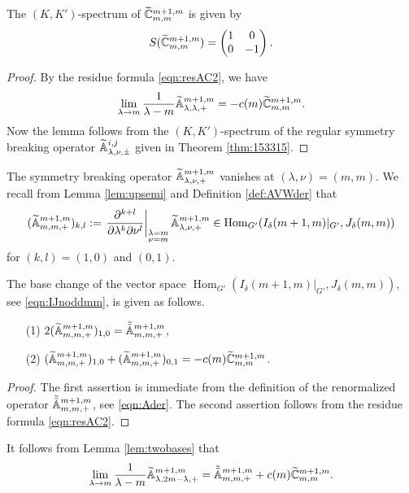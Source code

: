 \begin{lemma}
\label{lem:KKspecC}
The $(K,K')$-spectrum of $\widetilde{{\mathbb{C}}}_{{m},{m}}^{{m+1,m}}$ is given by
\[
   S(\widetilde{{\mathbb{C}}}_{{m},{m}}^{{m+1,m}})
   = \begin{pmatrix} 1 & 0 \\ 0 & -1 \end{pmatrix}.  
\]
\end{lemma}
\begin{proof}
By the residue formula \eqref{eqn:resAC2}, 
 we have
\[
  \lim_{\lambda \to m}
  \frac 1 {\lambda-m} {\widetilde{\mathbb{A}}}_{{\lambda},{\lambda},{+}}^{{m+1,m}}
  = 
  -c(m)\widetilde{{\mathbb{C}}}_{{m},{m}}^{{m+1,m}}.  
\]
Now the lemma follows from the $(K,K')$-spectrum
 of the regular symmetry breaking operator
 ${\widetilde{\mathbb{A}}}_{{\lambda},{\nu},{\pm}}^{{i,j}}$
 given in Theorem \ref{thm:153315}.  
\end{proof}



The symmetry breaking operator ${\widetilde{\mathbb{A}}}_{{\lambda},{\nu},{+}}^{{m+1,m}}$
 vanishes at $(\lambda,\nu)=(m,m)$.  
We recall from Lemma \ref{lem:upsemi}
 and Definition \ref{def:AVWder}
 that 
\[
  ({\widetilde{\mathbb{A}}}_{{m},{m},{+}}^{{m+1,m}})_{k,l}
  :=
   \left.
   \frac{\partial^{k+l}}{\partial \lambda^{k}\partial \nu^{l}}
   \right|
   _{\substack{\lambda=m \\ \nu=m}}
   {\widetilde{\mathbb{A}}}_{{\lambda},{\nu},{+}}^{{m+1,m}}
   \in {\operatorname{Hom}}_{G'}
   (I_{\delta}(m+1,m)|_{G'}, J_{\delta}(m,m))
\]
 for $(k,l)=(1,0)$ and $(0,1)$.  



The base change of the vector space
 ${\operatorname{Hom}}_{G'}
   (I_{\delta}(m+1,m)|_{G'}, J_{\delta}(m,m))$, 
 see \eqref{eqn:IJnoddmm}, 
 is given as follows.  

\begin{lemma}
\label{lem:twobases}
\begin{enumerate}
\item[{\rm{(1)}}]
$2 ({\widetilde{\mathbb{A}}}_{{m},{m},{+}}^{{m+1,m}})_{1,0}= \tilde{\tilde{{\mathbb{A}}}}_{{m},{m},{+}}^{{m+1,m}}$, 
\item[{\rm{(2)}}]
$({\widetilde{\mathbb{A}}}_{{m},{m},{+}}^{{m+1,m}})_{1,0} + ({\widetilde{\mathbb{A}}}_{{m},{m},{+}}^{{m+1,m}})_{0,1}
 = -c(m) \widetilde{{\mathbb{C}}}_{{m},{m}}^{{m+1,m}}$.  
\end{enumerate}
\end{lemma}
\begin{proof}
The first assertion is immediate from the definition 
 of the renormalized operator 
 $\tilde{\tilde{{\mathbb{A}}}}_{{m},{m},{+}}^{{m+1,m}}$, 
 see \eqref{eqn:Ader}.  
The second assertion follows from the residue formula 
 \eqref{eqn:resAC2}.  
\end{proof}
It follows from Lemma \ref{lem:twobases}
 that 
\begin{equation}
\label{eqn:AClimit}
  \lim_{\lambda \to m}
  \frac 1 {\lambda-m} {\widetilde{\mathbb{A}}}_{{\lambda},{2m-\lambda},{+}}^{{m+1,m}}
  = 
  \tilde{\tilde{{\mathbb{A}}}}_{{m},{m},{+}}^{{m+1,m}}
  +c(m) \widetilde{{\mathbb{C}}}_{{m},{m}}^{{m+1,m}}.  
\end{equation}


